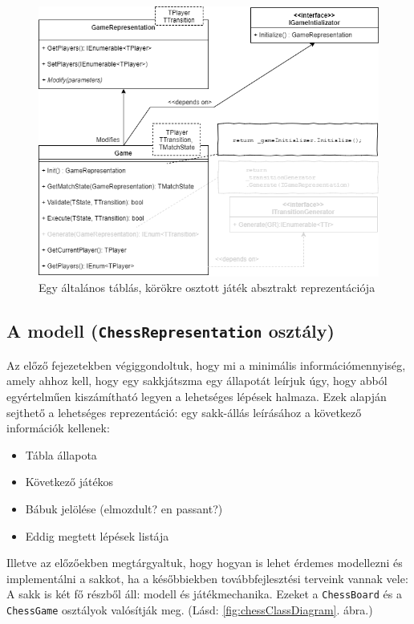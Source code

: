 \documentclass[twoside, a4paper, 12pt]{book}
\begin{document}
\begin{figure}[htbp]
	\centering
	\includegraphics[width=1.0\textwidth]{img/boardGameAbstractClassDiagram.png}
	\caption{Egy általános táblás, körökre osztott játék absztrakt reprezentációja}
	\label{fig:boardGameAbstractClassDiagram}
\end{figure}

\subsection{A modell (\texttt{ChessRepresentation} osztály)}
Az előző fejezetekben végiggondoltuk, hogy mi a minimális információmennyiség, amely ahhoz kell, hogy egy sakkjátszma egy állapotát leírjuk úgy, hogy abból egyértelműen kiszámítható legyen a lehetséges lépések halmaza. Ezek alapján sejthető a lehetséges reprezentáció: egy sakk-állás leírásához a következő információk kellenek:
\begin{itemize}
	\item Tábla állapota
	\item Következő játékos
	\item Bábuk jelölése (elmozdult? en passant?)
	\item Eddig megtett lépések listája
\end{itemize}

Illetve az előzőekben megtárgyaltuk, hogy hogyan is lehet érdemes modellezni és implementálni a sakkot, ha a későbbiekben továbbfejlesztési terveink vannak vele: A sakk is két fő részből áll: modell és játékmechanika. Ezeket a \texttt{ChessBoard} és a \texttt{ChessGame} osztályok valósítják meg. (Lásd: \ref{fig:chessClassDiagram}. ábra.)
\end{document}

